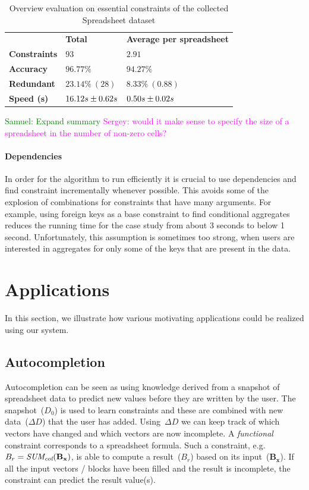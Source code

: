 \documentclass{IEEEtran}
\newcommand{\sergey}[1]{\textcolor{magenta}{{\sc Sergey:} #1}\xspace}
\newcommand{\samuel}[1]{\textcolor{green}{{\sc Samuel:} #1}\xspace}
\newcommand{\eccalc}[2]{\ensuremath{#1 = #2}}
\newcommand{\ecsumc}[2]{\eccalc{#1}{\textit{SUM\textsubscript{col}}(#2)}}
\theoremstyle{definition}
\begin{document}
\begin{table}
  \centering
  \begin{tabular}{lll}
    & \textbf{Total} & \textbf{Average per spreadsheet} \\
    \textbf{Constraints} & $93$ & $2.91$ \\
    \textbf{Accuracy} & $96.77\%$ & $94.27\%$ \\
    \textbf{Redundant} & $23.14\%~(28)$ & $8.33\%~(0.88)$ \\
    \textbf{Speed (s)} & ${16.12}s \pm {0.62}s$ & ${0.50}s \pm {0.02}s$
  \end{tabular}
  \caption{Overview evaluation on essential constraints of the collected Spreadsheet dataset}
\end{table}
\samuel{Expand summary}
\sergey{would it make sense to specify the size of a spreadsheet in the number of non-zero cells?}

\paragraph{Dependencies}
In order for the algorithm to run efficiently it is crucial to use dependencies and find constraint incrementally whenever possible.
This avoids some of the explosion of combinations for constraints that have many arguments.
For example, using foreign keys as a base constraint to find conditional aggregates reduces the running time for the case study from about 3 seconds to below 1 second.
Unfortunately, this assumption is sometimes too strong, when users are interested in aggregates for only some of the keys that are present in the data.





\section{Applications}\label{sec:applications}
In this section, we illustrate how various motivating applications could be realized using our system.





\subsection{Autocompletion}
Autocompletion can be seen as using knowledge derived from a snapshot of spreadsheet data to predict new values before they are written by the user.
The snapshot~($D_0$) is used to learn constraints and these are combined with new data~($\Delta D$) that the user has added.
Using~$\Delta D$ we can keep track of which vectors have changed and which vectors are now incomplete.
A \textit{functional} constraint corresponds to a spreadsheet formula.
Such a constraint, e.g. $\ecsumc{B_r}{\mathbf{B_x}}$, is able to compute a result~($B_r$) based on its input~($\mathbf{B_x}$).
If all the input vectors / blocks have been filled and the result is incomplete, the constraint can predict the result value(s).
\end{document}
